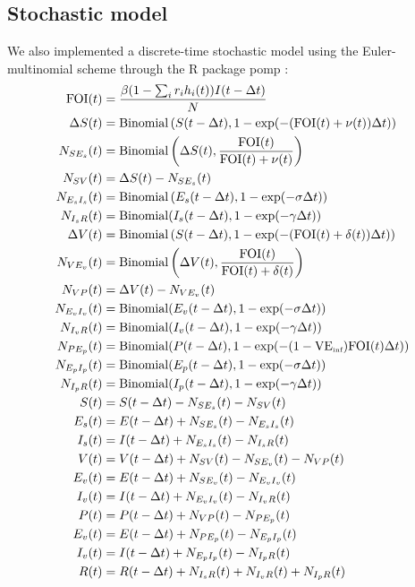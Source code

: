 \documentclass[12pt]{article}
\begin{document}
\subsection*{Stochastic model}

We also implemented a discrete-time stochastic model using the Euler-multinomial scheme through the R package pomp \citep{king2015statistical}:
\begin{align}
\textrm{FOI}(t) &= \frac{\beta (1 - \sum_i r_i h_i(t)) I(t-\Delta t)}{N}\\
\Delta S(t) &= \mathrm{Binomial}\left(S(t-\Delta t),1- \exp(-(\textrm{FOI}(t) + \nu(t)) \Delta t )\right)\\
N_{SE_s}(t) &= \mathrm{Binomial}\left(\Delta S(t), \frac{\textrm{FOI}(t)}{\textrm{FOI}(t) + \nu(t)} \right)\\
N_{SV}(t) &= \Delta S(t) - N_{SE_s}(t)\\
N_{E_sI_s}(t) &= \mathrm{Binomial}\left(E_s(t-\Delta t), 1- \exp(-\sigma \Delta t )\right)\\
N_{I_sR}(t) &= \mathrm{Binomial}(I_s(t-\Delta t), 1- \exp(-\gamma \Delta t))\\
\Delta V(t) &= \mathrm{Binomial}\left( S(t-\Delta t), 1- \exp(-(\textrm{FOI}(t) + \delta(t)) \Delta t )\right)\\
N_{VE_v}(t) &= \mathrm{Binomial}\left(\Delta V(t), \frac{\textrm{FOI}(t)}{\textrm{FOI}(t) + \delta(t)}  \right) \\
N_{VP}(t) &= \Delta V(t) -N_{VE_v}(t)  \\
N_{E_vI_v}(t) &= \mathrm{Binomial}(E_v(t-\Delta t), 1- \exp(-\sigma \Delta t ))\\
N_{I_vR}(t) &= \mathrm{Binomial}(I_v(t-\Delta t), 1- \exp(-\gamma \Delta t ))\\
N_{PE_p}(t) &= \mathrm{Binomial}(P(t-\Delta t), 1-\exp(-(1-\mathrm{VE}_{\textrm{\tiny{inf}}})\textrm{FOI}(t) \Delta t))\\
N_{E_pI_p}(t) &= \mathrm{Binomial}(E_p(t-\Delta t), 1- \exp(-\sigma \Delta t))\\
N_{I_pR}(t) &= \mathrm{Binomial}(I_p(t-\Delta t), 1- \exp(-\gamma \Delta t))\\
S(t) &= S(t-\Delta t) - N_{SE_s}(t) - N_{SV}(t)\\
E_s(t) &= E(t-\Delta t) + N_{SE_s}(t) - N_{E_sI_s}(t)\\
I_s(t) &= I(t-\Delta t) + N_{E_sI_s}(t) - N_{I_sR}(t)\\
V(t) &= V(t-\Delta t) + N_{SV}(t) - N_{SE_v}(t) - N_{VP}(t)\\
E_v(t) &= E(t-\Delta t) + N_{SE_v}(t) - N_{E_vI_v}(t)\\
I_v(t) &= I(t-\Delta t) + N_{E_vI_v}(t) - N_{I_vR}(t)\\
P(t) &= P(t-\Delta t) + N_{VP}(t) - N_{PE_p}(t)\\
E_v(t) &= E(t-\Delta t) + N_{PE_p}(t) - N_{E_pI_p}(t)\\
I_v(t) &= I(t-\Delta t) + N_{E_pI_p}(t) - N_{I_pR}(t)\\
R(t) &= R(t-\Delta t) + N_{I_sR}(t) + N_{I_vR}(t) + N_{I_pR}(t)
\end{align}
\end{document}
